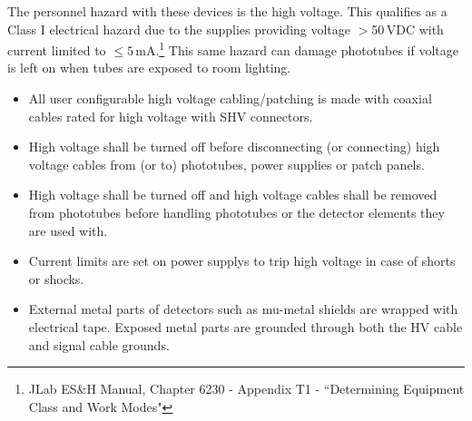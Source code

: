 \begin{safetyen}{0}{0}

The personnel hazard with these devices is the high voltage.
This qualifies as a Class I electrical hazard due to the supplies providing
voltage $>$50\,VDC with current limited to $\leq 5$\,mA.\footnote{JLab ES\&H
  Manual, Chapter 6230 - Appendix T1 - ``Determining Equipment Class and Work
  Modes"}
This same hazard can
damage phototubes if voltage is left on when tubes are exposed to room
lighting.

\begin{itemize}
  \item All user configurable high voltage cabling/patching is made with
  coaxial cables rated for high voltage with SHV connectors.
  \item High voltage shall be turned off before disconnecting (or connecting)
  high voltage cables from (or to) phototubes, power supplies or patch panels.
  \item High voltage shall be turned off and high voltage cables shall
  be removed from phototubes before handling phototubes or the detector
  elements they are used with.
  \item Current limits are set on power supplys to trip high voltage in case
  of shorts or shocks.
  \item External metal parts of detectors such as mu-metal shields are wrapped
  with electrical tape.  Exposed metal parts are grounded through both the HV
  cable and signal cable grounds.
\end{itemize}



\end{safetyen}
